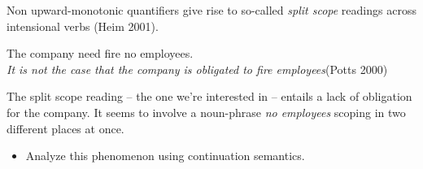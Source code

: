 \documentclass[nols,twoside,nofonts,nobib,nohyper]{tufte-handout}
\begin{document}
Non upward-monotonic quantifiers give rise to so-called \textit{split scope}
readings across intensional verbs (Heim 2001).

\ex
The company need fire no employees.\\
\textit{It is not the case that the company is obligated to fire
  employees}\hfill (Potts 2000)
\xe

The split scope reading -- the one we're interested in -- entails a lack of
obligation for the company. It seems to involve a noun-phrase \textit{no
  employees} scoping in two different places at once.

\begin{itemize}

    \item Analyze this phenomenon using continuation semantics.

\end{itemize}
\end{document}
